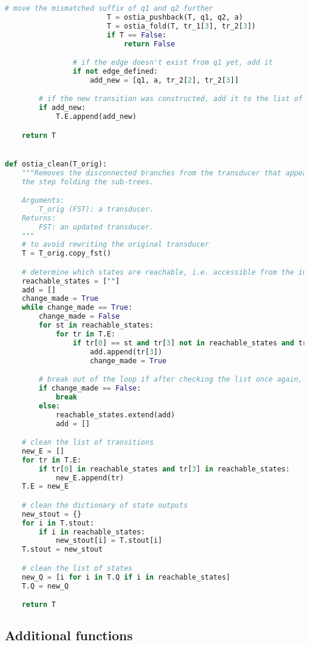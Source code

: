 \begin{lstlisting}[language=Python]
                        # move the mismatched suffix of q1 and q2 further
                        T = ostia_pushback(T, q1, q2, a)
                        T = ostia_fold(T, tr_1[3], tr_2[3])
                        if T == False:
                            return False

                # if the edge doesn't exist from q1 yet, add it
                if not edge_defined:
                    add_new = [q1, a, tr_2[2], tr_2[3]]

        # if the new transition was constructed, add it to the list of transitions
        if add_new:
            T.E.append(add_new)

    return T


def ostia_clean(T_orig):
    """Removes the disconnected branches from the transducer that appear due to
    the step folding the sub-trees.

    Arguments:
        T_orig (FST): a transducer.
    Returns:
        FST: an updated transducer.
    """
    # to avoid rewriting the original transducer
    T = T_orig.copy_fst()

    # determine which states are reachable, i.e. accessible from the initial state
    reachable_states = [""]
    add = []
    change_made = True
    while change_made == True:
        change_made = False
        for st in reachable_states:
            for tr in T.E:
                if tr[0] == st and tr[3] not in reachable_states and tr[3] not in add:
                    add.append(tr[3])
                    change_made = True

        # break out of the loop if after checking the list once again, no states were added
        if change_made == False:
            break
        else:
            reachable_states.extend(add)
            add = []

    # clean the list of transitions
    new_E = []
    for tr in T.E:
        if tr[0] in reachable_states and tr[3] in reachable_states:
            new_E.append(tr)
    T.E = new_E

    # clean the dictionary of state outputs
    new_stout = {}
    for i in T.stout:
        if i in reachable_states:
            new_stout[i] = T.stout[i]
    T.stout = new_stout

    # clean the list of states
    new_Q = [i for i in T.Q if i in reachable_states]
    T.Q = new_Q

    return T
\end{lstlisting}

\subsection*{Additional functions}

